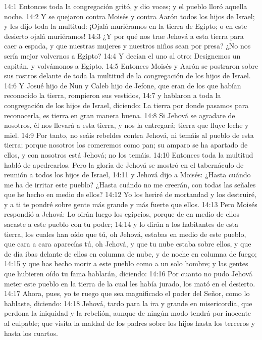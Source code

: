 14:1 Entonces toda la congregación gritó, y dio voces; y el pueblo lloró aquella noche.  
14:2 Y se quejaron contra Moisés y contra Aarón todos los hijos de Israel; y les dijo toda la multitud: ¡Ojalá muriéramos en la tierra de Egipto; o en este desierto ojalá muriéramos!  
14:3 ¿Y por qué nos trae Jehová a esta tierra para caer a espada, y que nuestras mujeres y nuestros niños sean por presa? ¿No nos sería mejor volvernos a Egipto?  
14:4 Y decían el uno al otro: Designemos un capitán, y volvámonos a Egipto.  
14:5 Entonces Moisés y Aarón se postraron sobre sus rostros delante de toda la multitud de la congregación de los hijos de Israel.  
14:6 Y Josué hijo de Nun y Caleb hijo de Jefone, que eran de los que habían reconocido la tierra, rompieron sus vestidos,  
14:7 y hablaron a toda la congregación de los hijos de Israel, diciendo: La tierra por donde pasamos para reconocerla, es tierra en gran manera buena.  
14:8 Si Jehová se agradare de nosotros, él nos llevará a esta tierra, y nos la entregará; tierra que fluye leche y miel.  
14:9 Por tanto, no seáis rebeldes contra Jehová, ni temáis al pueblo de esta tierra; porque nosotros los comeremos como pan; su amparo se ha apartado de ellos, y con nosotros está Jehová; no los temáis.  
14:10 Entonces toda la multitud habló de apedrearlos. Pero la gloria de Jehová se mostró en el tabernáculo de reunión a todos los hijos de Israel,  
14:11 y Jehová dijo a Moisés: ¿Hasta cuándo me ha de irritar este pueblo? ¿Hasta cuándo no me creerán, con todas las señales que he hecho en medio de ellos?  
14:12 Yo los heriré de mortandad y los destruiré, y a ti te pondré sobre gente más grande y más fuerte que ellos.  
14:13 Pero Moisés respondió a Jehová: Lo oirán luego los egipcios, porque de en medio de ellos sacaste a este pueblo con tu poder;  
14:14 y lo dirán a los habitantes de esta tierra, los cuales han oído que tú, oh Jehová, estabas en medio de este pueblo, que cara a cara aparecías tú, oh Jehová, y que tu nube estaba sobre ellos, y que de día ibas delante de ellos en columna de nube, y de noche en columna de fuego;  
14:15 y que has hecho morir a este pueblo como a un solo hombre; y las gentes que hubieren oído tu fama hablarán, diciendo:  
14:16 Por cuanto no pudo Jehová meter este pueblo en la tierra de la cual les había jurado, los mató en el desierto.  
14:17 Ahora, pues, yo te ruego que sea magnificado el poder del Señor, como lo hablaste, diciendo: 
14:18 Jehová, tardo para la ira y grande en misericordia, que perdona la iniquidad y la rebelión, aunque de ningún modo tendrá por inocente al culpable; que visita la maldad de los padres sobre los hijos hasta los terceros y hasta los cuartos.  

